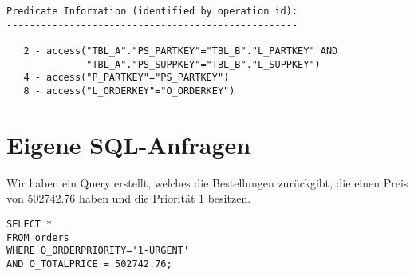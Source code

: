 \documentclass[11pt,a4paper,parskip=half]{scrartcl}
\begin{document}
\begin{lstlisting}
Predicate Information (identified by operation id):                                                                                                                                                                                                                                                          
---------------------------------------------------                                                                                                                                                                                                                                                          
                                                                                                                                                                                                                                                                                                             
   2 - access("TBL_A"."PS_PARTKEY"="TBL_B"."L_PARTKEY" AND                                                                                                                                                                                                                                                   
              "TBL_A"."PS_SUPPKEY"="TBL_B"."L_SUPPKEY")                                                                                                                                                                                                                                                      
   4 - access("P_PARTKEY"="PS_PARTKEY")                                                                                                                                                                                                                                                                      
   8 - access("L_ORDERKEY"="O_ORDERKEY")                                                                                                                                                                                                                                                                     
\end{lstlisting}

\section{Eigene SQL-Anfragen}
Wir haben ein Query erstellt, welches die Bestellungen zurückgibt, die einen Preis von  502742.76 haben und die Priorität 1 besitzen.
\begin{lstlisting}
SELECT *
FROM orders
WHERE O_ORDERPRIORITY='1-URGENT'
AND O_TOTALPRICE = 502742.76;
\end{lstlisting}
\end{document}
